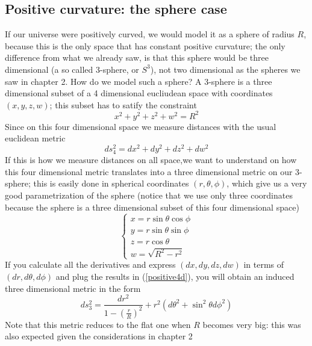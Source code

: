 \subsection{Positive curvature: the sphere case}
If our universe were positively curved, we would model it as a sphere of radius $R$, because this is the only space that has constant positive curvature; the only difference from what we already saw, is that this sphere would be three dimensional (a so called 3-sphere, or $S^3$), not two dimensional as the spheres we saw in chapter 2. How do we model such a sphere? A 3-sphere is a three dimensional subset of a 4 dimensional eucliudean space with coordinates $(x,y,z,w)$; this subset has to satify the constraint
\begin{equation}
x^2+y^2+z^2+w^2=R^2
\end{equation}
Since on this four dimensional space we measure distances with the usual euclidean metric 
\begin{equation}
\label{positive4d}
ds_4^2=dx^2+dy^2+dz^2+dw^2
\end{equation}
If this is how we measure distances on all space,we want to understand on how this four dimensional metric translates into a three dimensional metric on our 3-sphere; this is easily done in spherical coordinates $(r,\theta,\phi)$, which give us a very good parametrization of the sphere (notice that we use only three coordinates because the sphere is a three dimensional subset of this four dimensional space) 
\begin{displaymath}
\left \{ \begin{array}{l}x=r\sin{\theta}\cos{\phi} \\ 
y=r\sin{\theta}\sin{\phi} \\ 
z=r\cos{\theta} \\
w= \sqrt{R^2-r^2} \end{array}  \right.  
\end{displaymath} 
If you calculate all the derivatives and express $(dx,dy,dz,dw)$ in terms of $(dr,d\theta,d\phi)$ and plug the results in (\ref{positive4d}), you will obtain an induced three dimensional metric in the form
\begin{equation}
\label{poscurv}
ds_3^2=\frac{dr^2}{1-\left(\frac{r}{R}\right)^2} + r^2(d\theta^2 + \sin^2{\theta}d\phi^2)
\end{equation}
Note that this metric reduces to the flat one when $R$ becomes very big: this was also expected given the considerations in chapter 2
